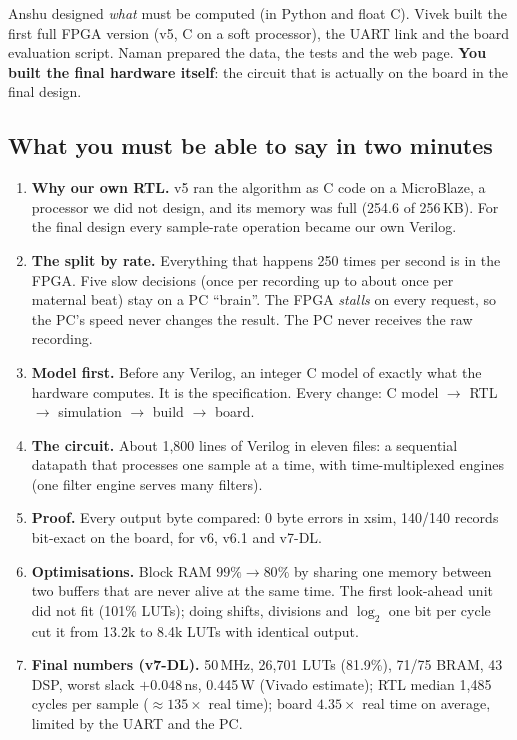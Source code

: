 \documentclass[11pt]{article}
\begin{document}
Anshu designed \emph{what} must be computed (in Python and float C). Vivek built the first full FPGA version (v5, C on a soft processor), the UART link and the board evaluation script. Naman prepared the data, the tests and the web page. \textbf{You built the final hardware itself}: the circuit that is actually on the board in the final design.

\subsection*{What you must be able to say in two minutes}
\begin{enumerate}
  \item \textbf{Why our own RTL.} v5 ran the algorithm as C code on a MicroBlaze, a processor we did not design, and its memory was full (254.6 of 256\,KB). For the final design every sample-rate operation became our own Verilog.
  \item \textbf{The split by rate.} Everything that happens 250 times per second is in the FPGA. Five slow decisions (once per recording up to about once per maternal beat) stay on a PC ``brain''. The FPGA \emph{stalls} on every request, so the PC's speed never changes the result. The PC never receives the raw recording.
  \item \textbf{Model first.} Before any Verilog, an integer C model of exactly what the hardware computes. It is the specification. Every change: C model $\to$ RTL $\to$ simulation $\to$ build $\to$ board.
  \item \textbf{The circuit.} About 1,800 lines of Verilog in eleven files: a sequential datapath that processes one sample at a time, with time-multiplexed engines (one filter engine serves many filters).
  \item \textbf{Proof.} Every output byte compared: 0 byte errors in xsim, 140/140 records bit-exact on the board, for v6, v6.1 and v7-DL.
  \item \textbf{Optimisations.} Block RAM $99\% \to 80\%$ by sharing one memory between two buffers that are never alive at the same time. The first look-ahead unit did not fit (101\% LUTs); doing shifts, divisions and $\log_2$ one bit per cycle cut it from 13.2k to 8.4k LUTs with identical output.
  \item \textbf{Final numbers (v7-DL).} 50\,MHz, 26,701 LUTs (81.9\%), 71/75 BRAM, 43 DSP, worst slack $+0.048$\,ns, 0.445\,W (Vivado estimate); RTL median 1,485 cycles per sample ($\approx 135\times$ real time); board $4.35\times$ real time on average, limited by the UART and the PC.
\end{enumerate}
\end{document}
